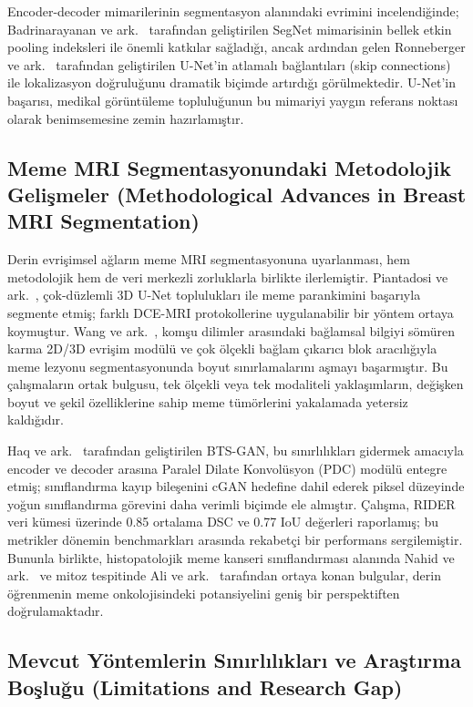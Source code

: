 \documentclass[10pt,journal,compsoc]{IEEEtran}
\begin{document}
Encoder-decoder mimarilerinin segmentasyon alanındaki evrimini incelendiğinde; Badrinarayanan ve ark.\ \cite{badrinarayanan2017segnet} tarafından geliştirilen SegNet mimarisinin bellek etkin pooling indeksleri ile önemli katkılar sağladığı, ancak ardından gelen Ronneberger ve ark.\ \cite{ronneberger2015u} tarafından geliştirilen U-Net'in atlamalı bağlantıları (skip connections) ile lokalizasyon doğruluğunu dramatik biçimde artırdığı görülmektedir. U-Net'in başarısı, medikal görüntüleme topluluğunun bu mimariyi yaygın referans noktası olarak benimsemesine zemin hazırlamıştır.

\subsection{Meme MRI Segmentasyonundaki Metodolojik Gelişmeler \textnormal{\small{(Methodological Advances in Breast MRI Segmentation)}}}

Derin evrişimsel ağların meme MRI segmentasyonuna uyarlanması, hem metodolojik hem de veri merkezli zorluklarla birlikte ilerlemiştir. Piantadosi ve ark.\ \cite{piantadosi2020multiplanar}, çok-düzlemli 3D U-Net toplulukları ile meme parankimini başarıyla segmente etmiş; farklı DCE-MRI protokollerine uygulanabilir bir yöntem ortaya koymuştur. Wang ve ark.\ \cite{wang2021mixed}, komşu dilimler arasındaki bağlamsal bilgiyi sömüren karma 2D/3D evrişim modülü ve çok ölçekli bağlam çıkarıcı blok aracılığıyla meme lezyonu segmentasyonunda boyut sınırlamalarını aşmayı başarmıştır. Bu çalışmaların ortak bulgusu, tek ölçekli veya tek modaliteli yaklaşımların, değişken boyut ve şekil özelliklerine sahip meme tümörlerini yakalamada yetersiz kaldığıdır.

Haq ve ark.\ \cite{haq2022bts} tarafından geliştirilen BTS-GAN, bu sınırlılıkları gidermek amacıyla encoder ve decoder arasına Paralel Dilate Konvolüsyon (PDC) modülü entegre etmiş; sınıflandırma kayıp bileşenini cGAN hedefine dahil ederek piksel düzeyinde yoğun sınıflandırma görevini daha verimli biçimde ele almıştır. Çalışma, RIDER veri kümesi üzerinde 0.85 ortalama DSC ve 0.77 IoU değerleri raporlamış; bu metrikler dönemin benchmarkları arasında rekabetçi bir performans sergilemiştir. Bununla birlikte, histopatolojik meme kanseri sınıflandırması alanında Nahid ve ark.\ \cite{nahid2018histopath} ve mitoz tespitinde Ali ve ark.\ \cite{ali2021mitosis} tarafından ortaya konan bulgular, derin öğrenmenin meme onkolojisindeki potansiyelini geniş bir perspektiften doğrulamaktadır.

\subsection{Mevcut Yöntemlerin Sınırlılıkları ve Araştırma Boşluğu \textnormal{\small{(Limitations and Research Gap)}}}
\end{document}

